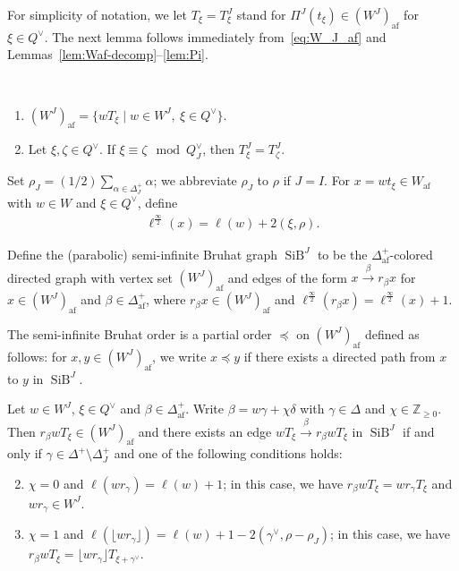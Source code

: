 \documentclass[ALCO,ThmDefs,Unicode,epreuves]{cedram}
\newcommand{\BZ}{\mathbb{Z}}
\newcommand{\si}{\frac{\infty}{2}}
\DeclareMathOperator{\af}{af}
\DeclareMathOperator{\SiB}{SiB}
\begin{document}
For simplicity of notation, we let $T_{\xi} = T_{\xi}^J$ stand for 
$\Pi^J(t_{\xi}) \in (W^J)_{\af}$ for $\xi \in Q^{\vee}$. 
The next lemma follows immediately from~\eqref{eq:W_J_af} and Lemmas~\ref{lem:Waf-decomp}--\ref{lem:Pi}.

\begin{lemm} \label{lem:T_xi}\ \\[-1.2em]
\begin{enumerate}[label=(\arabic*)]
\item\label{Lemm2.4_1}
$(W^J)_{\af} = \{ wT_{\xi} \mid w \in W^J , \ \xi \in Q^{\vee} \}$.
\item\label{Lemm2.4_2}
Let 
$\xi , \zeta \in Q^{\vee}$. 
If 
$\xi \equiv \zeta \mod Q_J^{\vee}$, 
then 
$T_{\xi}^J = T_{\zeta}^J$. 
\end{enumerate}
\end{lemm}

Set $\rho_J = (1/2)\sum_{\alpha \in \Delta_J^+} \alpha$; 
we abbreviate $\rho_J$ to $\rho$ if $J = I$. 
For $x = wt_{\xi} \in W_{\af}$ with $w \in W$ and $\xi \in Q^{\vee}$, define
\begin{align}
\ell^{\si}(x) = \ell(w) + 2 ( \xi,\rho ).
\end{align}

Define the (parabolic) semi-infinite Bruhat graph $\SiB ^J$ 
to be the $\Delta_{\af}^+$-colored directed graph 
with vertex set $(W^J)_{\af}$ and edges of the form 
$x \xrightarrow{\ \beta \ } r_{\beta} x$ 
for 
$x \in (W^J)_{\af}$ and $\beta \in \Delta_{\af}^+$, 
where
$r_{\beta} x \in (W^J)_{\af}$ 
and 
$\ell^{\si}(r_{\beta}x) = \ell^{\si}(x) + 1$.

The semi-infinite Bruhat order is a partial order $\preceq$ on $(W^J)_{\af}$ 
defined as follows: 
for $x , y \in (W^J)_{\af}$, we write $x \preceq y$ 
if there exists a directed path from $x$ to $y$ in $\SiB ^J$.

\begin{prop} \label{prop:phi_J}
Let $w \in W^J$, $\xi \in Q^{\vee}$ and $\beta \in \Delta_{\af}^+$. 
Write 
$\beta = w\gamma + \chi\delta$ 
with 
$\gamma \in \Delta$ 
and 
$\chi \in \BZ_{\geq 0}$.
Then 
$r_{\beta}wT_{\xi} \in (W^J)_{\af}$
and there exists an edge 
$wT_{\xi} \xrightarrow{\ \beta \ } r_{\beta}wT_{\xi}$ in $\SiB ^J$ 
if and only if $\gamma \in \Delta^+ \setminus \Delta_J^+$ 
and one of the following conditions holds:
\begin{enumerate}[label=(\Alph*)]\setcounter{enumi}{1}
\item\label{Prop2.5_B} %
$\chi = 0$
and 
$\ell(w r_{\gamma}) = \ell(w) + 1$; 
in this case, we have 
$r_{\beta}wT_{\xi} = w r_{\gamma} T_{\xi}$ 
and 
$wr_{\gamma} \in W^J$.\setcounter{enumi}{16}
\item\label{Prop2.5_Q} %
$\chi = 1$ 
and 
$\ell(\lfloor w r_{\gamma} \rfloor) = \ell(w) + 1 - 2( \gamma^{\vee} , \rho - \rho_J )$; 
in this case, we have
$r_{\beta}wT_{\xi} = \lfloor w r_{\gamma} \rfloor T_{\xi + \gamma^{\vee}}$.
\end{enumerate}
\end{prop}
\end{document}
